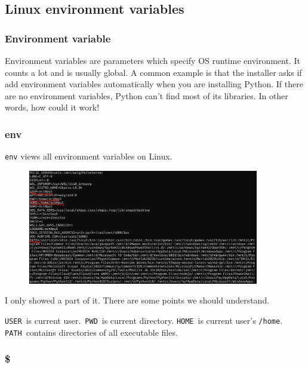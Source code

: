 \documentclass[12pt]{ctexart}
\begin{document}
\newpage
\subsection{\textbf{Linux environment variables}}

\subsubsection{\textbf{Environment variable}}

Environment variables are parameters which specify OS runtime
environment. It counts a lot and is usually global. A common example is
that the installer asks if add environment variables automatically when
you are installing Python. If there are no environment variables, Python
can't find most of its libraries. In other words, how
could it work!

\subsubsection{\textbf{env}}

\texttt{env} views all environment variables on Linux.

\begin{figure}[H]
    \centering
    \includegraphics[width=0.9\textwidth,keepaspectratio]{assets/Linux/1.11 Linux environment variables/1.png}
\end{figure}

I only showed a part of it. There are some points we should understand.

\texttt{USER}\ is current user.\ \texttt{PWD}\ is current directory.
\texttt{HOME}\ is current user's \texttt{/home}.
\texttt{PATH}\ contains directories of all executable files.

\subsubsection{\textbf{\$}}
\end{document}
